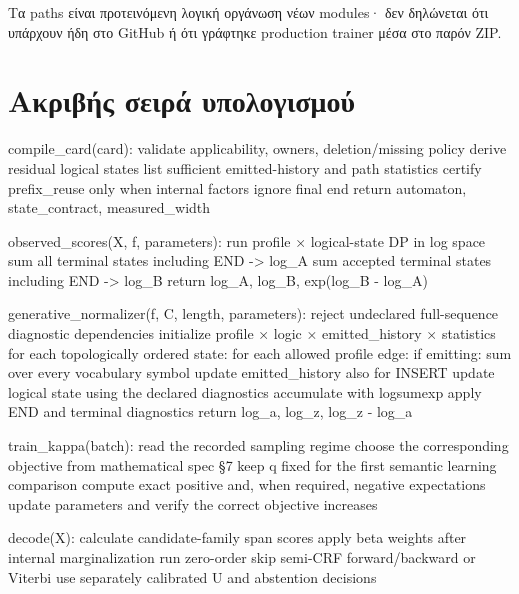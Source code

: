 \documentclass[
  10pt,
  a4paper,
]{report}
\newenvironment{Shaded}{}{}
\newcommand{\NormalTok}[1]{#1}
\begin{document}
Τα paths είναι προτεινόμενη λογική οργάνωση νέων modules· δεν δηλώνεται
ότι υπάρχουν ήδη στο GitHub ή ότι γράφτηκε production trainer μέσα στο
παρόν ZIP.

\section{Ακριβής σειρά
υπολογισμού}\label{ux3b1ux3baux3c1ux3b9ux3b2ux3aeux3c2-ux3c3ux3b5ux3b9ux3c1ux3ac-ux3c5ux3c0ux3bfux3bbux3bfux3b3ux3b9ux3c3ux3bcux3bfux3cd}

\begin{Shaded}
\begin{Highlighting}[]
\NormalTok{compile\_card(card):}
\NormalTok{    validate applicability, owners, deletion/missing policy}
\NormalTok{    derive residual logical states}
\NormalTok{    list sufficient emitted{-}history and path statistics}
\NormalTok{    certify prefix\_reuse only when internal factors ignore final end}
\NormalTok{    return automaton, state\_contract, measured\_width}

\NormalTok{observed\_scores(X, f, parameters):}
\NormalTok{    run profile × logical{-}state DP in log space}
\NormalTok{    sum all terminal states including END {-}\textgreater{} log\_A}
\NormalTok{    sum accepted terminal states including END {-}\textgreater{} log\_B}
\NormalTok{    return log\_A, log\_B, exp(log\_B {-} log\_A)}

\NormalTok{generative\_normalizer(f, C, length, parameters):}
\NormalTok{    reject undeclared full{-}sequence diagnostic dependencies}
\NormalTok{    initialize profile × logic × emitted\_history × statistics}
\NormalTok{    for each topologically ordered state:}
\NormalTok{        for each allowed profile edge:}
\NormalTok{            if emitting: sum over every vocabulary symbol}
\NormalTok{            update emitted\_history also for INSERT}
\NormalTok{            update logical state using the declared diagnostics}
\NormalTok{            accumulate with logsumexp}
\NormalTok{    apply END and terminal diagnostics}
\NormalTok{    return log\_a, log\_z, log\_z {-} log\_a}

\NormalTok{train\_kappa(batch):}
\NormalTok{    read the recorded sampling regime}
\NormalTok{    choose the corresponding objective from mathematical spec §7}
\NormalTok{    keep q fixed for the first semantic learning comparison}
\NormalTok{    compute exact positive and, when required, negative expectations}
\NormalTok{    update parameters and verify the correct objective increases}

\NormalTok{decode(X):}
\NormalTok{    calculate candidate{-}family span scores}
\NormalTok{    apply beta weights after internal marginalization}
\NormalTok{    run zero{-}order skip semi{-}CRF forward/backward or Viterbi}
\NormalTok{    use separately calibrated U and abstention decisions}
\end{Highlighting}
\end{Shaded}
\end{document}
